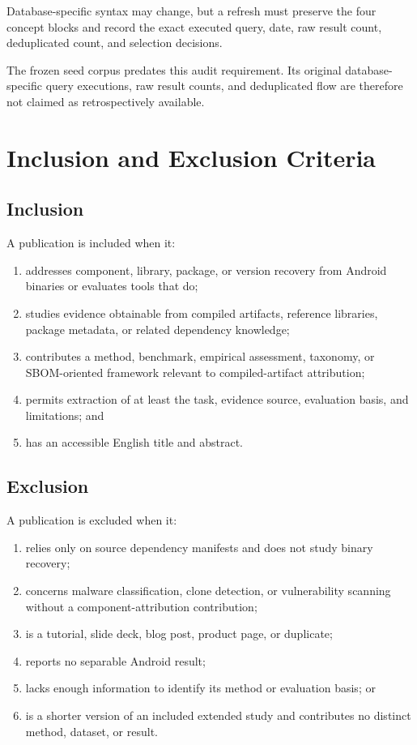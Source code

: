Database-specific syntax may change, but a refresh must preserve the four
concept blocks and record the exact executed query, date, raw result count,
deduplicated count, and selection decisions.

The frozen seed corpus predates this audit requirement. Its original
database-specific query executions, raw result counts, and deduplicated flow
are therefore not claimed as retrospectively available.

\section{Inclusion and Exclusion Criteria}

\subsection{Inclusion}

A publication is included when it:

\begin{enumerate}
  \item addresses component, library, package, or version recovery from Android
    binaries or evaluates tools that do;
  \item studies evidence obtainable from compiled artifacts, reference
    libraries, package metadata, or related dependency knowledge;
  \item contributes a method, benchmark, empirical assessment, taxonomy, or
    SBOM-oriented framework relevant to compiled-artifact attribution;
  \item permits extraction of at least the task, evidence source, evaluation
    basis, and limitations; and
  \item has an accessible English title and abstract.
\end{enumerate}

\subsection{Exclusion}

A publication is excluded when it:

\begin{enumerate}
  \item relies only on source dependency manifests and does not study binary
    recovery;
  \item concerns malware classification, clone detection, or vulnerability
    scanning without a component-attribution contribution;
  \item is a tutorial, slide deck, blog post, product page, or duplicate;
  \item reports no separable Android result;
  \item lacks enough information to identify its method or evaluation basis;
    or
  \item is a shorter version of an included extended study and contributes no
    distinct method, dataset, or result.
\end{enumerate}

